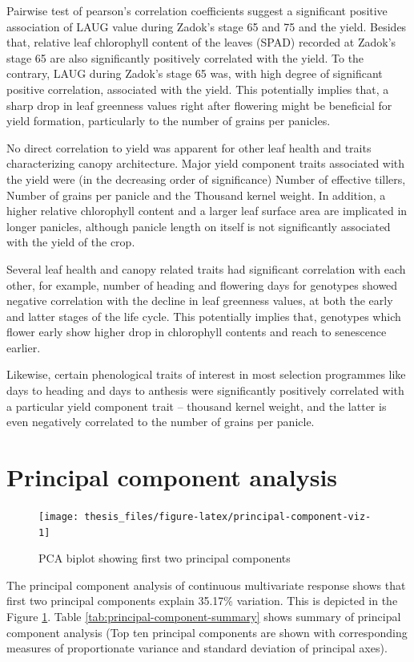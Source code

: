 \documentclass[12pt,oneside]{dukestatscithesis} %
\begin{document}
Pairwise test of pearson's correlation coefficients suggest a significant positive association of LAUG value during Zadok's stage 65 and 75 and the yield. Besides that, relative leaf chlorophyll content of the leaves (SPAD) recorded at Zadok's stage 65 are also significantly positively correlated with the yield. To the contrary, LAUG during Zadok's stage 65 was, with high degree of significant positive correlation, associated with the yield. This potentially implies that, a sharp drop in leaf greenness values right after flowering might be beneficial for yield formation, particularly to the number of grains per panicles.

No direct correlation to yield was apparent for other leaf health and traits characterizing canopy architecture. Major yield component traits associated with the yield were (in the decreasing order of significance) Number of effective tillers, Number of grains per panicle and the Thousand kernel weight. In addition, a higher relative chlorophyll content and a larger leaf surface area are implicated in longer panicles, although panicle length on itself is not significantly associated with the yield of the crop.

Several leaf health and canopy related traits had significant correlation with each other, for example, number of heading and flowering days for genotypes showed negative correlation with the decline in leaf greenness values, at both the early and latter stages of the life cycle. This potentially implies that, genotypes which flower early show higher drop in chlorophyll contents and reach to senescence earlier.

Likewise, certain phenological traits of interest in most selection programmes like days to heading and days to anthesis were significantly positively correlated with a particular yield component trait -- thousand kernel weight, and the latter is even negatively correlated to the number of grains per panicle.

\hypertarget{principal-component-analysis}{%
\section{Principal component analysis}\label{principal-component-analysis}}
\begin{figure}[H]

{\centering \texttt{[image: thesis\_files/figure-latex/principal-component-viz-1]} 

}

\caption{PCA biplot showing first two principal components}\label{fig:principal-component-viz}
\end{figure}
The principal component analysis of continuous multivariate response shows that first two principal components explain 35.17\% variation. This is depicted in the Figure \ref{fig:principal-component-viz}. Table \ref{tab:principal-component-summary} shows summary of principal component analysis (Top ten principal components are shown with corresponding measures of proportionate variance and standard deviation of principal axes).
\end{document}
